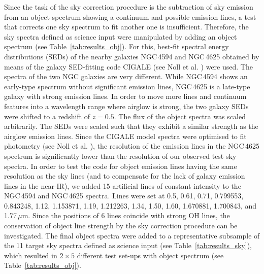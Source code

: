 Since the task of the sky correction procedure is the subtraction of sky
emission from an object spectrum showing a continuum and possible emission
lines, a test that corrects one sky spectrum to fit another one is
insufficient. Therefore, the sky spectra defined as science input were
manipulated by adding an object spectrum (see Table~\ref{tab:results_obj}). For
this, best-fit spectral energy distributions (SEDs) of the nearby galaxies
NGC\,4594 and NGC\,4625 obtained by means of the galaxy SED-fitting code CIGALE
(see Noll et al. \cite{NOL09}) were used. The spectra of the two NGC galaxies
are very different. While NGC\,4594 shows an early-type spectrum without
significant emission lines, NGC\,4625 is a late-type galaxy with strong
emission lines. In order to move more lines and continuum features into a
wavelength range where airglow is strong, the two galaxy SEDs were shifted
to a redshift of $z = 0.5$. The flux of the object spectra was scaled
arbitrarily. The SEDs were scaled such that they exhibit a similar strength as
the airglow emission lines. Since the CIGALE model spectra were optimised to fit
photometry (see Noll et al. \cite{NOL09}), the resolution of the emission lines
in the NGC\,4625 spectrum is significantly lower than the resolution of our
observed test sky spectra. In order to test the code for object emission lines
having the same resolution as the sky lines (and to compensate for the lack of
galaxy emission lines in the near-IR), we added 15 artificial lines of constant
intensity to the NGC\,4594 and NGC\,4625 spectra. Lines were set at 0.5, 0.61,
0.71, 0.799553, 0.843248, 1.12, 1.153871, 1.19, 1.212263, 1.34, 1.50, 1.60,
1.670881, 1.700843, and 1.77\,$\mu$m. Since the positions of 6 lines coincide
with strong OH lines, the conservation of object line strength by the sky
correction procedure can be investigated. The final object spectra were added
to a representative subsample of the 11 target sky spectra defined as science
input (see Table~\ref{tab:results_sky}), which resulted in $2 \times 5$
different test set-ups with object spectrum (see Table~\ref{tab:results_obj}).

